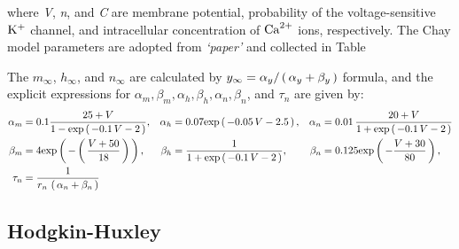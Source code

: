 \documentclass[../../Orator.tex]{subfiles}
\begin{document}
where \textit{V}, \textit{n}, and \textit{C} are membrane potential, probability of the voltage-sensitive \(\mathrm{K}^+\) channel, and intracellular concentration of \(\mathrm{Ca}^{2+}\) ions, respectively. The Chay model parameters are adopted from \textit{`paper'} and collected in Table

The \(m_\infty\), \(h_\infty\), and \(n_\infty\) are calculated by \(y_\infty = \alpha_y / \left(\,\alpha_y + \beta_y\,\right) \) formula, and the explicit expressions for 
\(\alpha_m, \beta_m, \alpha_h, \beta_h, \alpha_n, \beta_n\), and \(\tau_n\) are given by:
\begin{align*}
    \alpha_m &= 0.1 \frac{ 25 + V }{1 - \mathrm{exp}\left(\,-0.1 \, V - 2\,\right)}, &
    \alpha_h &=  0.07 \mathrm{exp}\left(\,-0.05\,V -2.5\,\right), &
    \alpha_n &= 0.01 \, \frac{ 20 + V }{ 1 + \mathrm{exp}\left(\,-0.1 \, V - 2\,\right)} \\
    \beta_m  &= 4 \mathrm{exp}\left(\,-\left(\,\frac{ V + 50 }{ 18 } \,\right) \,\right), &
    \beta_h  &= \frac{ 1 }{ 1 + \mathrm{exp}\left(\,-0.1 \, V - 2\,\right)}, &
    \beta_n  &= 0.125 \mathrm{exp}\left(\,- \frac{V + 30}{80}\,\right), \\
    \tau_n &= \frac{1}{ r_n \, \left(\,\alpha_n + \beta_n\,\right) }
\end{align*}



\newpage
\subsection{Hodgkin-Huxley}\label{sec:HHMeth}
\end{document}
